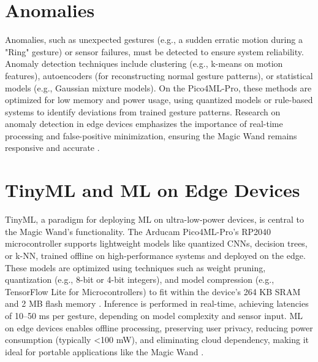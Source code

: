 \section{Anomalies}

Anomalies, such as unexpected gestures (e.g., a sudden erratic motion during a "Ring" gesture) or sensor failures, must be detected to ensure system reliability. Anomaly detection techniques include clustering (e.g., k-means on motion features), autoencoders (for reconstructing normal gesture patterns), or statistical models (e.g., Gaussian mixture models). On the Pico4ML-Pro, these methods are optimized for low memory and power usage, using quantized models or rule-based systems to identify deviations from trained gesture patterns. Research on anomaly detection in edge devices emphasizes the importance of real-time processing and false-positive minimization, ensuring the Magic Wand remains responsive and accurate \cite{Gupta:2022, Perumandla:2021, VboxAutomotive:2023}.



\section{TinyML and ML on Edge Devices}

TinyML, a paradigm for deploying ML on ultra-low-power devices, is central to the Magic Wand’s functionality. The Arducam Pico4ML-Pro’s RP2040 microcontroller supports lightweight models like quantized CNNs, decision trees, or k-NN, trained offline on high-performance systems and deployed on the edge. These models are optimized using techniques such as weight pruning, quantization (e.g., 8-bit or 4-bit integers), and model compression (e.g., TensorFlow Lite for Microcontrollers) to fit within the device’s 264 KB SRAM and 2 MB flash memory \cite{Banerjee:2023, Sadiq:2022}. Inference is performed in real-time, achieving latencies of 10–50 ms per gesture, depending on model complexity and sensor input. ML on edge devices enables offline processing, preserving user privacy, reducing power consumption (typically <100 mW), and eliminating cloud dependency, making it ideal for portable applications like the Magic Wand \cite{Wang:2019, RobotShop:2023}.

  















